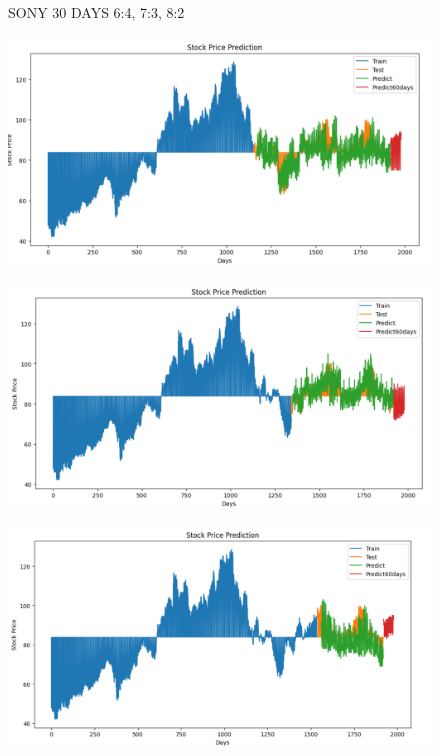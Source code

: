 \documentclass{article}
\begin{document}
\begin{multicols}{2}
\begin{figure}[H]
\begin{minipage}{0.15\textwidth}
    \label{fig:3}
    \end{minipage}
    \caption{SONY 30 DAYS  6:4, 7:3, 8:2 }
\end{figure}


\begin{figure}[H]
    \centering
    \begin{minipage}{0.15\textwidth}
    \centering
    \includegraphics[width=1\textwidth]{Image/N_Beat/N_BEAT_6_4_SONY_60DAYS.png}
   
    \label{fig:1}
    \end{minipage}%
    \begin{minipage}{0.15\textwidth}
    \centering
    \includegraphics[width=1\textwidth]{Image/N_Beat/N_BEAT_7_3_SONY_60DAYS.png}
  
    \label{fig:2}
    \end{minipage}%
    \begin{minipage}{0.15\textwidth}
    \centering
    \includegraphics[width=1\textwidth]{Image/N_Beat/N_BEAT_8_2_SONY_60DAYS.png}


\end{minipage}
\end{figure}
\end{multicols}
\end{document}
